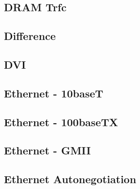 \pagebreak
\subsection{DRAM Trfc}

\pagebreak
\subsection{Difference}

\pagebreak
\subsection{DVI}
\label{filter:dvi}

\pagebreak
\subsection{Ethernet - 10baseT}

\pagebreak
\subsection{Ethernet - 100baseTX}

\pagebreak
\subsection{Ethernet - GMII}

\pagebreak
\subsection{Ethernet Autonegotiation}

\pagebreak
